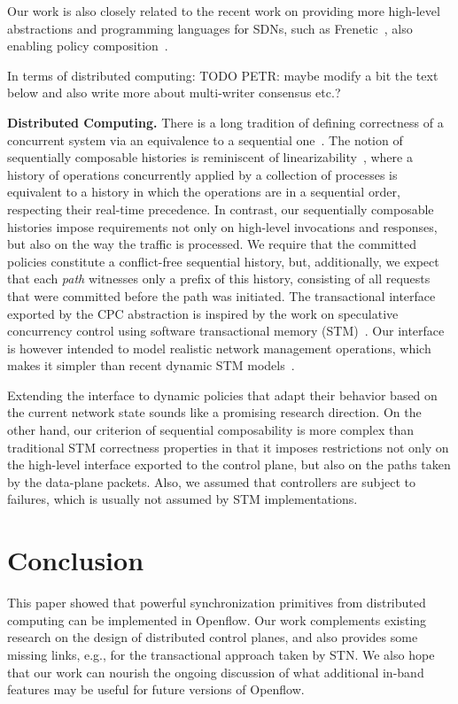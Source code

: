 \documentclass[conference]{sigcomm-alternate}
\begin{document}
Our work is also closely related to the recent work on providing more high-level
abstractions and programming languages for SDNs, such as Frenetic~\cite{frenetic}, 
also enabling policy composition~\cite{pyretic}.  

In terms of distributed computing: TODO PETR: maybe modify a bit the text below
and also write more about multi-writer consensus etc.?

\noindent\textbf{Distributed Computing.}
There is a long tradition of defining correctness of a concurrent system via
an equivalence to a sequential one~\cite{Pap79-serial,Lam79,HW90}.  The notion
of sequentially composable histories is reminiscent of
linearizability~\cite{HW90}, where a history of operations concurrently
applied by a collection of processes is equivalent to a history in which the
operations are in a sequential order, respecting their real-time precedence.
In contrast, our sequentially composable histories impose requirements not
only on high-level invocations and responses, but also on the way the traffic
is processed. We require that the committed policies constitute a
conflict-free sequential history, but, additionally,  we expect that each
\emph{path} witnesses only a prefix of this history, consisting of all
requests that were committed before the path was initiated.
%
The transactional interface exported by the CPC abstraction is inspired by the
work on speculative concurrency control using software transactional memory
(STM)~\cite{stm-st95}.
Our interface is however intended to model realistic network
management operations, which makes it simpler than recent
dynamic STM models~\cite{dstm}.

Extending the interface to dynamic policies that adapt their behavior based on
the current network state sounds like a promising research direction.  On the
other hand, our criterion of sequential composability is more complex than
traditional STM correctness properties in that it imposes restrictions not only
on the high-level interface exported to the control plane, but also on the
paths taken by the data-plane packets.
Also, we assumed that controllers are subject to failures, which is usually not
assumed by STM implementations.


\section{Conclusion}\label{sec:conclusion}

This paper showed that powerful synchronization primitives
from distributed computing can be implemented in Openflow. 
Our work complements existing research on the design of
distributed control planes, and also provides some missing links,
e.g., for the transactional approach taken by STN. 
We also hope that our work can nourish the ongoing discussion of
what additional in-band features may be useful for future
versions of Openflow.

{

}
\end{document}
